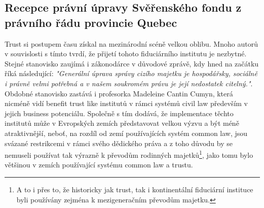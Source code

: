 \documentclass{article}
\begin{document}

\newpage

\subsection{Recepce právní úpravy Svěřenského fondu z právního řádu provincie Quebec}


Trust si postupem času získal na mezinárodní scéně velkou oblibu. Mnoho autorů v souvislosti s tímto tvrdí, že přijetí tohoto fiduciárního institutu je nezbytné. Stejné stanovisko zaujímá i zákonodárce v důvodové zprávě, kdy hned na začátku říká následující: \textit{"Generální úprava správy cizího majetku je hospodářsky, sociálně i právně velmi potřebná a v našem soukromém právu je její nedostatek citelný."}.\\

Obdobné stanovisko zastává i profesorka Madeleine Cantin Cumyn, která nicméně vidí benefit trust like institutů v rámci systémů civil law především v jejich business potenciálu. Společně s tím dodává, že implementace těchto institutů může v Evropských zemích představovat velkou výzvu a být méně atraktivnější, neboť, na rozdíl od zemí používajících systém common law, jsou svázané restrikcemi v rámci svého dědického práva a z toho důvodu by se nemuseli používat tak výrazně k převodům rodinných majetků\footnote{A to i přes to, že historicky jak trust, tak i kontinentální fiduciární instituce byli používány zejména k mezigeneračním převodům majetku.}, jako tomu bylo většinou v zemích používající systému common law a trustu.\\

\end{document}
